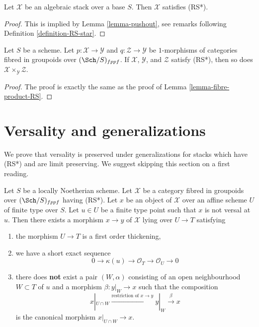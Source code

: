 \begin{lemma}
\label{lemma-algebraic-stack-RS-star}
Let $\mathcal{X}$ be an algebraic stack over a base $S$.
Then $\mathcal{X}$ satisfies (RS*).
\end{lemma}

\begin{proof}
This is implied by Lemma \ref{lemma-pushout}, see
remarks following Definition \ref{definition-RS-star}.
\end{proof}

\begin{lemma}
\label{lemma-fibre-product-RS-star}
Let $S$ be a scheme. Let $p : \mathcal{X} \to \mathcal{Y}$ and
$q : \mathcal{Z} \to \mathcal{Y}$ be $1$-morphisms of categories
fibred in groupoids over $(\Sch/S)_{fppf}$. If $\mathcal{X}$, $\mathcal{Y}$,
and $\mathcal{Z}$ satisfy (RS*), then so
does $\mathcal{X} \times_\mathcal{Y} \mathcal{Z}$.
\end{lemma}

\begin{proof}
The proof is exactly the same as the proof of
Lemma \ref{lemma-fibre-product-RS}.
\end{proof}








\section{Versality and generalizations}
\label{section-generalize-versality}

\noindent
We prove that versality is preserved under generalizations
for stacks which have (RS*) and are limit preserving.
We suggest skipping this section on a first reading.

\begin{lemma}
\label{lemma-single-point}
Let $S$ be a locally Noetherian scheme. Let $\mathcal{X}$ be a category
fibred in groupoids over $(\Sch/S)_{fppf}$ having (RS*).
Let $x$ be an object of $\mathcal{X}$ over an affine scheme $U$
of finite type over $S$. Let $u \in U$ be a finite type point such that
$x$ is not versal at $u$. Then there exists a morphism $x \to y$
of $\mathcal{X}$ lying over $U \to T$ satisfying
\begin{enumerate}
\item the morphism $U \to T$ is a first order thickening,
\item we have a short exact sequence
$$
0 \to \kappa(u) \to \mathcal{O}_T \to \mathcal{O}_U \to 0
$$
\item there does {\bf not} exist a pair $(W, \alpha)$
consisting of an open neighbourhood $W \subset T$ of $u$
and a morphism $\beta : y|_W \to x$ such that the composition
$$
x|_{U \cap W} \xrightarrow{\text{restriction of }x \to y}
y|_W \xrightarrow{\beta} x
$$
is the canonical morphism $x|_{U \cap W} \to x$.
\end{enumerate}
\end{lemma}

